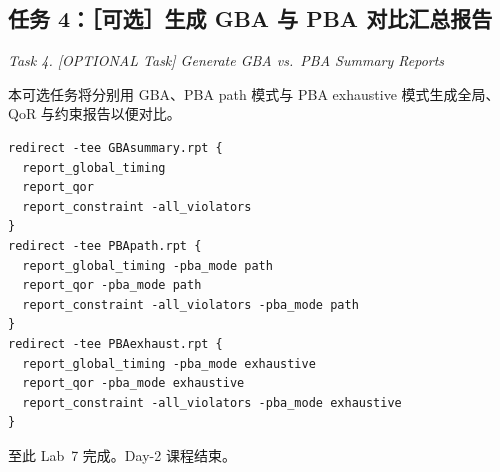 \subsection{任务 4：［可选］生成 GBA 与 PBA 对比汇总报告}
\label{lab7:task4}

\noindent\textit{Task 4. [OPTIONAL Task] Generate GBA vs.\ PBA Summary Reports}

本可选任务将分别用 GBA、PBA path 模式与 PBA exhaustive 模式生成全局、QoR 与约束报告以便对比。

\begin{lstlisting}
redirect -tee GBAsummary.rpt {
  report_global_timing
  report_qor
  report_constraint -all_violators
}
redirect -tee PBApath.rpt {
  report_global_timing -pba_mode path
  report_qor -pba_mode path
  report_constraint -all_violators -pba_mode path
}
redirect -tee PBAexhaust.rpt {
  report_global_timing -pba_mode exhaustive
  report_qor -pba_mode exhaustive
  report_constraint -all_violators -pba_mode exhaustive
}
\end{lstlisting}

\noindent 至此 Lab~7 完成。Day-2 课程结束。

